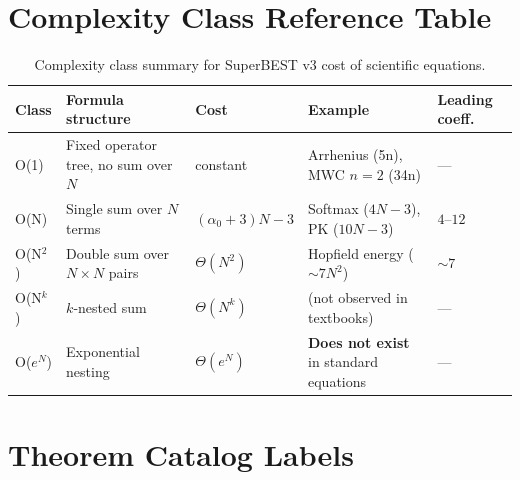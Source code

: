 \documentclass[12pt,a4paper]{article}
\theoremstyle{definition}
\begin{document}
\section{Complexity Class Reference Table}
\label{sec:reference}

\begin{table}[h]
\centering
\caption{Complexity class summary for SuperBEST v3 cost of scientific equations.}
\label{tab:classes}
\smallskip
\begin{tabular}{@{}lllll@{}}
\toprule
\textbf{Class} & \textbf{Formula structure} & \textbf{Cost}
               & \textbf{Example} & \textbf{Leading coeff.} \\
\midrule
O(1) & Fixed operator tree, no sum over $N$
     & constant
     & Arrhenius (5n), MWC $n=2$ (34n)
     & --- \\
O(N) & Single sum over $N$ terms
     & $(\alpha_0 + 3)N - 3$
     & Softmax ($4N-3$), PK ($10N-3$)
     & $4$--$12$ \\
O(N$^2$) & Double sum over $N\times N$ pairs
     & $\Theta(N^2)$
     & Hopfield energy ($\sim 7N^2$)
     & $\sim 7$ \\
O(N$^k$) & $k$-nested sum
     & $\Theta(N^k)$
     & (not observed in textbooks)
     & --- \\
O($e^N$) & Exponential nesting
     & $\Theta(e^N)$
     & \textbf{Does not exist} in standard equations
     & --- \\
\bottomrule
\end{tabular}
\end{table}

\section*{Theorem Catalog Labels}
\end{document}
